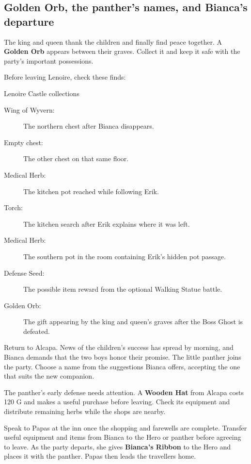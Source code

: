 \subsection{Golden Orb, the panther's names, and Bianca's departure}

The king and queen thank the children and finally find peace together.
A \textbf{Golden Orb} appears between their graves. Collect it and keep
it safe with the party's important possessions.

Before leaving Lenoire, check these finds:
\begin{routecheck}{Lenoire Castle collections}
\begin{description}
  \item[Wing of Wyvern:] The northern chest after Bianca disappears.
  \item[Empty chest:] The other chest on that same floor.
  \item[Medical Herb:] The kitchen pot reached while following Erik.
  \item[Torch:] The kitchen search after Erik explains where it was left.
  \item[Medical Herb:] The southern pot in the room containing Erik's
    hidden pot passage.
  \item[Defense Seed:] The possible item reward from the optional
    Walking Statue battle.
  \item[Golden Orb:] The gift appearing by the king and queen's graves
    after the Boss Ghost is defeated.
\end{description}
\end{routecheck}

Return to Alcapa. News of the children's success has spread by morning,
and Bianca demands that the two boys honor their promise. The little
panther joins the party. Choose a name from the suggestions Bianca offers,
accepting the one that suits the new companion.

The panther's early defense needs attention. A \textbf{Wooden Hat} from
Alcapa costs 120 G and makes a useful purchase before leaving. Check its
equipment and distribute remaining herbs while the shops are nearby.

Speak to Papas at the inn once the shopping and farewells are complete.
Transfer useful equipment and items from Bianca to the Hero or panther
before agreeing to leave. As the party departs, she gives
\textbf{Bianca's Ribbon} to the Hero and places it with the panther.
Papas then leads the travellers home.

